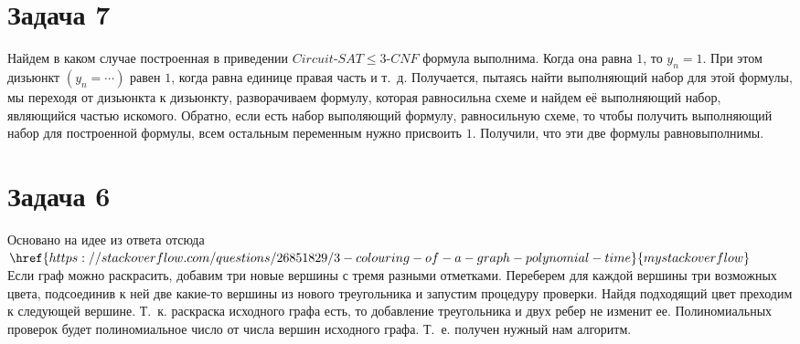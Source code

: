 \documentclass[a4paper,12pt]{article} %
\begin{document}
\section*{Задача 7}
	 
Найдем в каком случае построенная в приведении $Circuit\text{-}SAT \leq 3\text{-}CNF$ формула выполнима. Когда она равна $1$, то $y_n = 1$. При этом дизьюнкт $(y_n = \cdots)$ равен $1$, когда равна единице правая часть и т.~д. Получается, пытаясь найти выполняющий набор для этой формулы, мы переходя от дизьюнкта к дизьюнкту, разворачиваем формулу, которая равносильна схеме и найдем её выполняющий набор, являющийся частью искомого. Обратно, если есть набор выполяющий формулу, равносильную схеме, то чтобы получить выполняющий набор для построенной формулы, всем остальным переменным нужно присвоить $1$. Получили, что эти две формулы равновыполнимы.\\

\section*{Задача 6}
Основано на идее из ответа отсюда $\href{https://stackoverflow.com/questions/26851829/3-colouring-of-a-graph-polynomial-time}{mystackoverflow}$\\
Если граф можно раскрасить, добавим три новые вершины с тремя разными отметками. Переберем для каждой вершины три возможных цвета, подсоединив к ней две какие-то вершины из нового треугольника и запустим процедуру проверки. Найдя подходящий цвет преходим к следующей вершине. Т.~к. раскраска исходного графа есть, то добавление треугольника и двух ребер не изменит ее. Полиномиальных проверок будет полиномиальное число от числа вершин исходного графа. Т.~е. получен нужный нам алгоритм.\\  
 
\end{document}
